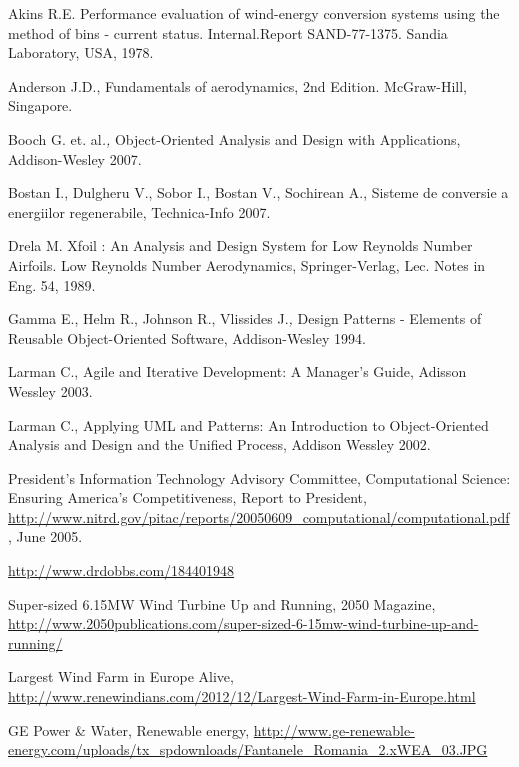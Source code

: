 \begin{thebibliography}{99999}
\singlespace\normalsize

 Akins R.E. Performance evaluation of wind-energy conversion systems using the method of bins - current status. Internal.Report SAND-77-1375. Sandia Laboratory, USA, 1978. 

Anderson J.D., Fundamentals of aerodynamics, 2nd Edition. McGraw-Hill, Singapore.

 Booch G. et. al\textit{., }Object-Oriented Analysis and Design with
Applications, Addison-Wesley 2007.

Bostan I., Dulgheru V., Sobor I., Bostan V., Sochirean A., Sisteme de
conversie a energiilor regenerabile, Technica-Info 2007.

Drela M. Xfoil : An Analysis and Design System for Low Reynolds Number Airfoils. Low Reynolds Number Aerodynamics, Springer-Verlag, Lec. Notes in Eng. 54, 1989.

 Gamma E., Helm R., Johnson R., Vlissides J.\textit{, }Design Patterns -
Elements of Reusable Object-Oriented Software, Addison-Wesley 1994.

 Larman C., Agile and Iterative Development: A Manager's Guide, Adisson
Wessley 2003.

 Larman C., Applying UML and Patterns: An Introduction to Object-Oriented
Analysis and Design and the Unified Process, Addison Wessley 2002.

 President’s Information Technology Advisory Committee, Computational Science: Ensuring America’s Competitiveness, Report to President, \url{http://www.nitrd.gov/pitac/reports/20050609_computational/computational.pdf}, June 2005. 

 \url{http://www.drdobbs.com/184401948}

Super-sized 6.15MW Wind Turbine Up and Running, 2050 Magazine, \url{http://www.2050publications.com/super-sized-6-15mw-wind-turbine-up-and-running/}

Largest Wind Farm in Europe Alive, \url{http://www.renewindians.com/2012/12/Largest-Wind-Farm-in-Europe.html}

GE Power \& Water, Renewable energy, \url{http://www.ge-renewable-energy.com/uploads/tx_spdownloads/Fantanele_Romania_2.xWEA_03.JPG}



\end{thebibliography}
